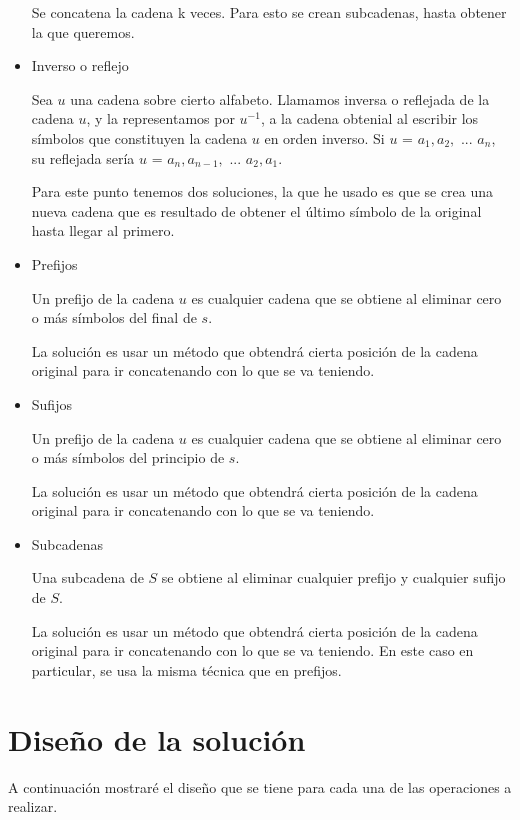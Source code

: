 \documentclass[12pt]{article}
\begin{document}
\begin{itemize}
		Se concatena la cadena k veces. Para esto se crean subcadenas, hasta obtener la 
		que queremos.

		\item Inverso o reflejo

		Sea $u$ una cadena sobre cierto alfabeto. Llamamos inversa o reflejada de la cadena $u$, y la representamos
		por $u^{-1}$, a la cadena obtenial al escribir los 
		símbolos que constituyen la cadena $u$ en orden inverso.
		Si $u$ = $a_{1}, a_{2},$ ... $a_{n}$, su reflejada sería
		$u$ = $a_{n}, a_{n-1},$ ... $a_{2}, a_{1}$.

		Para este punto tenemos dos soluciones, la que he usado es que se crea una nueva
		cadena que es resultado de obtener el último símbolo de la original hasta llegar
		al primero.

		\item Prefijos

		Un prefijo de la cadena $u$ es cualquier cadena que se
		obtiene al eliminar cero o más símbolos del final de $s$.

		La solución es usar un método que obtendrá cierta posición de la cadena original
		para ir concatenando con lo que se va teniendo.

		\item Sufijos

		Un prefijo de la cadena $u$ es cualquier cadena que se
		obtiene al eliminar cero o más símbolos del principio de 
		$s$.

		La solución es usar un método que obtendrá cierta posición de la cadena original
		para ir concatenando con lo que se va teniendo.
		
		\item Subcadenas

		Una subcadena de $S$ se obtiene al eliminar cualquier prefijo y cualquier sufijo de $S$.

		La solución es usar un método que obtendrá cierta posición de la cadena original
		para ir concatenando con lo que se va teniendo. En este caso en particular, se usa la
		misma técnica que en prefijos.

	\end{itemize}

	\newpage
	\section{Diseño de la solución}

	A continuación mostraré el diseño que se tiene para cada una de las operaciones a realizar.
\end{document}
